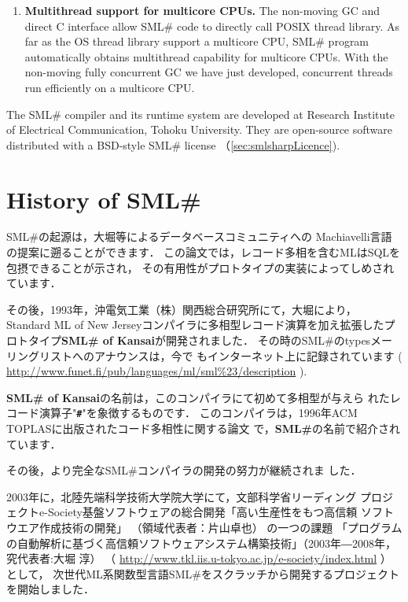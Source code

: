 \documentclass{jbook}
\newcommand{\txt}[2]{#2}
\newcommand{\smlsharp}{SML\#}
\newcommand{\code}[1]{\mbox{\large\tt #1}}
\begin{document}
\begin{enumerate}
\item {\bf Multithread support for multicore CPUs.}
	The non-moving GC \cite{ueno11icfp} and direct C interface allow
\smlsharp{} code to directly call POSIX thread library.
	As far as the OS thread library support a multicore CPU,
\smlsharp{} program automatically obtains multithread capability for
multicore CPUs.
	With the non-moving fully concurrent GC we have just developed, 
concurrent threads run efficiently on a multicore CPU.

\end{enumerate}

	The \smlsharp{} compiler and its runtime system are developed at
Research Institute of Electrical Communication,  Tohoku University.
	They are open-source software distributed with a BSD-style
\smlsharp{} license （\ref{sec:smlsharpLicence}).
\fi%

\section{\txt{\smlsharp{}の歴史}{History of \smlsharp{}}}
\label{sec:smlsharpHistory}

\ifjp%
	\smlsharp{}の起源は，大堀等によるデータベースコミュニティへの
Machiavelli言語の提案\cite{ohor89sigmod}に遡ることができます．
	この論文では，レコード多相を含むMLはSQLを包摂できることが示され，
その有用性がプロトタイプの実装によってしめされています．

	その後，1993年，沖電気工業（株）関西総合研究所にて，大堀により，
Standard ML of New Jerseyコンパイラに多相型レコード演算を加え拡張したプ
ロトタイプ{\bf SML\# of Kansai}が開発されました．
	その時の\smlsharp{}のtypesメーリングリストへのアナウンスは，今で
もインターネット上に記録されています
(
\url{http://www.funet.fi/pub/languages/ml/sml%23/description}
).

	{\bf SML\# of Kansai}の名前は，このコンパイラにて初めて多相型が与えら
れたレコード演算子"{\bf \code{\#}}"を象徴するものです．
	このコンパイラは，1996年ACM TOPLASに出版されたコード多相性に関する論文
\cite{ohor95toplas}で，{\bf \smlsharp{}}の名前で紹介されています．

	その後，より完全な\smlsharp{}コンパイラの開発の努力が継続されま
した．

	2003年に，北陸先端科学技術大学院大学にて，文部科学省リーディング
プロジェクトe-Society基盤ソフトウェアの総合開発「高い生産性をもつ高信頼
ソフトウエア作成技術の開発」
（領域代表者：片山卓也）
の一つの課題
「プログラムの自動解析に基づく高信頼ソフトウェアシステム構築技術」（2003年―2008年，究代表者:大堀 淳）
（
\url{http://www.tkl.iis.u-tokyo.ac.jp/e-society/index.html}
）
として，
次世代ML系関数型言語\smlsharp{}をスクラッチから開発するプロジェクトを開始しました．
\end{document}
